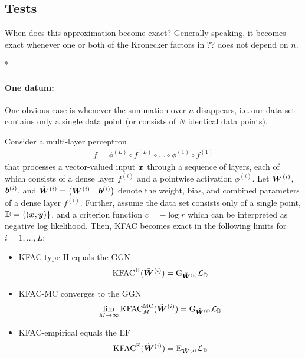 \switchcolumn[1]
\switchcolumn[0]

\subsection{Tests}
When does this approximation become exact?
Generally speaking, it becomes exact whenever one or both of the Kronecker factors in ??
does not depend on $n$.

\switchcolumn[1]*
\switchcolumn[0]

\paragraph{One datum:} One obvious case is whenever the summation over $n$ disappears, i.e.\,our data set contains only a single data point (or consists of $N$ identical data points).
\begin{test}
  Consider a multi-layer perceptron
  \begin{align*}
    f = \phi^{(L)} \circ f^{(L)} \circ \ldots \circ \phi^{(1)} \circ f^{(1)}
  \end{align*}
  that processes a vector-valued input ${\bm{x}}$ through a sequence of layers, each of which consists of a dense layer $f^{(i)}$ and a pointwise activation $\phi^{(i)}$.
  Let ${\bm{W}}^{(i)}$, ${\bm{b}}^{(i)}$, and $\tilde{{\bm{W}}}^{(i)} = \begin{pmatrix} {\bm{W}}^{(i)} & {\bm{b}}^{(i)} \end{pmatrix}$ denote the weight, bias, and combined parameters of a dense layer $f^{(i)}$.
  Further, assume the data set consists only of a single point, ${\mathbb{D}} = \{ ({\bm{x}}, {\bm{y}}) \}$, and a criterion function $c = - \log r$ which can be interpreted as negative log likelihood.
  Then, KFAC becomes exact in the following limits for $i = 1, \dots, L$:
  \begin{itemize}
  \item KFAC-type-II equals the GGN
    \begin{align*}
      \mathrm{KFAC}^{\text{II}}(\tilde{{\bm{W}}}^{(i)}) = \mathrm{G}_{\tilde{{\bm{W}}}^{(i)}}{\mathcal{L}}_{{\mathbb{D}}}
    \end{align*}
  \item KFAC-MC converges to the GGN
    \begin{align*}
      \lim_{M \to \infty} \mathrm{KFAC}^{\text{MC}}_M(\tilde{{\bm{W}}}^{(i)}) = \mathrm{G}_{\tilde{{\bm{W}}}^{(i)}}{\mathcal{L}}_{{\mathbb{D}}}
    \end{align*}
  \item KFAC-empirical equals the EF
    \begin{align*}
      \mathrm{KFAC}^{\text{E}}(\tilde{{\bm{W}}}^{(i)}) = \mathrm{E}_{\tilde{{\bm{W}}}^{(i)}}{\mathcal{L}}_{{\mathbb{D}}}
    \end{align*}
  \end{itemize}
\end{test}
